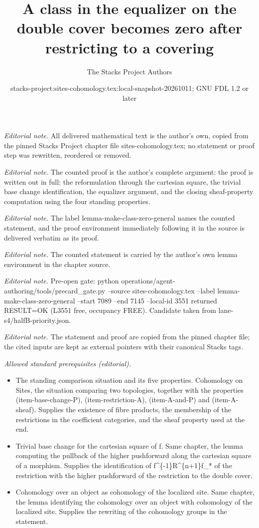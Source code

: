\documentclass[10pt,a4paper]{amsart}
\title{A class in the equalizer on the double cover becomes zero after restricting to a covering}
\author{The Stacks Project Authors}
\date{stacks-project:sites-cohomology.tex:local-snapshot-20261011; GNU FDL 1.2 or later}
\theoremstyle{plain}
\theoremstyle{definition}
\theoremstyle{remark}
\numberwithin{equation}{subsection}
\begin{document}
\maketitle
\noindent\textit{Editorial note.} All delivered mathematical text is the author's own, copied from the pinned Stacks Project chapter file sites-cohomology.tex; no statement or proof step was rewritten, reordered or removed.\par\medskip
\noindent\textit{Editorial note.} The counted proof is the author's complete argument: the proof is written out in full: the reformulation through the cartesian square, the trivial base change identification, the equalizer argument, and the closing sheaf-property computation using the four standing properties.\par\medskip
\noindent\textit{Editorial note.} The label lemma-make-class-zero-general names the counted statement, and the proof environment immediately following it in the source is delivered verbatim as its proof.\par\medskip
\noindent\textit{Editorial note.} The counted statement is carried by the author's own lemma environment in the chapter source.\par\medskip
\noindent\textit{Editorial note.} Pre-open gate: python operations/agent-authoring/tools/precard\_gate.py --source sites-cohomology.tex --label lemma-make-class-zero-general --start 7089 --end 7145 --local-id 3551 returned RESULT=OK (L3551 free, occupancy FREE). Candidate taken from lane-s4/halfB-priority.json.\par\medskip
\noindent\textit{Editorial note.} The statement and proof are copied from the pinned chapter file; the cited inputs are kept as external pointers with their canonical Stacks tags.\par\medskip
\noindent\textit{Allowed standard prerequisites (editorial).}\begin{itemize}
\item The standing comparison situation and its five properties. Cohomology on Sites, the situation comparing two topologies, together with the properties (item-base-change-P), (item-restriction-A), (item-A-and-P) and (item-A-sheaf). Supplies the existence of fibre products, the membership of the restrictions in the coefficient categories, and the sheaf property used at the end.
\item Trivial base change for the cartesian square of f. Same chapter, the lemma computing the pullback of the higher pushforward along the cartesian square of a morphism. Supplies the identification of f\textasciicircum{}\{-1\}R\textasciicircum{}\{n+1\}f\_* of the restriction with the higher pushforward of the restriction to the double cover.
\item Cohomology over an object as cohomology of the localized site. Same chapter, the lemma identifying the cohomology over an object with cohomology of the localized site. Supplies the rewriting of the cohomology groups in the statement.
\end{itemize}\medskip
\end{document}
